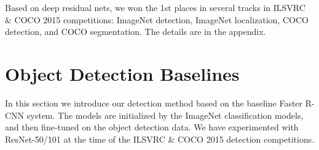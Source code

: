 \documentclass[10pt,twocolumn,letterpaper]{article}
\renewcommand\arraystretch{1.2}
\begin{document}
Based on deep residual nets, we won the 1st places in several tracks in ILSVRC \& COCO 2015 competitions: ImageNet detection, ImageNet localization, COCO detection, and COCO segmentation. The details are in the appendix.






  {
    \footnotesize
    
    
  }

\newpage

\appendix
\section{Object Detection Baselines}

In this section we introduce our detection method based on the baseline Faster R-CNN \cite{Ren2015} system.
The models are initialized by the ImageNet classification models, and then fine-tuned on the object detection data. We have experimented with ResNet-50/101 at the time of the ILSVRC \& COCO 2015 detection competitions.
\end{document}
